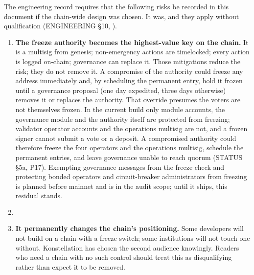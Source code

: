 The engineering record requires that the following risks be recorded in this
document if the chain-wide design was chosen. It was, and they apply without
qualification (ENGINEERING \S10, ).

\begin{enumerate}
\item \textbf{The freeze authority becomes the highest-value key on the chain.}
  It is a multisig from genesis; non-emergency actions are timelocked; every
  action is logged on-chain; governance can replace it. Those mitigations
  reduce the risk; they do not remove it. A compromise of the authority could
  freeze any address immediately and, by scheduling the permanent entry, hold
  it frozen until a governance proposal (one day expedited, three days
  otherwise) removes it or replaces the authority. That override presumes the
  voters are not themselves frozen. In the current build only module
  accounts, the governance module and the authority itself are protected from
  freezing; validator operator accounts and the operations multisig are not,
  and a frozen signer cannot submit a vote or a deposit. A compromised
  authority could therefore freeze the four operators and the operations
  multisig, schedule the permanent entries, and leave governance unable to
  reach quorum (STATUS \S5a, P17). Exempting governance messages from the
  freeze check and protecting bonded operators and circuit-breaker
  administrators from freezing is planned before mainnet and is in the audit
  scope; until it ships, this residual stands.
\item {}
\item \textbf{It permanently changes the chain's positioning.} Some developers
  will not build on a chain with a freeze switch; some institutions will not
  touch one without. Konstellation has chosen the second audience knowingly.
  Readers who need a chain with no such control should treat this as
  disqualifying rather than expect it to be removed.
\end{enumerate}

